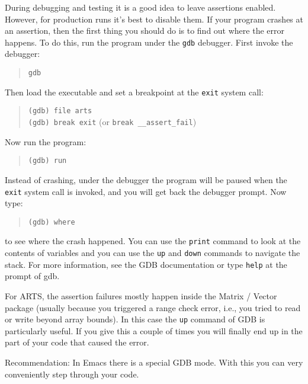 During debugging and testing it is a good idea to leave assertions
enabled. However, for production runs it's best to disable them. If
your program crashes at an assertion, then the first thing you should
do is to find out where the error happens. To do this, run the program
under the \verb|gdb| debugger. First invoke the debugger:
\begin{quote}
\verb|gdb|
\end{quote}
Then load the executable and set a breakpoint at the \verb|exit|
system call:
\begin{quote}
  \verb|(gdb) file arts|\\
  \verb|(gdb) break exit| (or \verb|break __assert_fail|)
\end{quote}
Now run the program: 
\begin{quote}
  \verb|(gdb) run|
\end{quote}

Instead of crashing, under the debugger the program will be paused
when the \verb|exit| system call is invoked, and you will get back the
debugger prompt. Now type:
\begin{quote}
  \verb|(gdb) where| 
\end{quote}  
to see where the crash happened. You can use the \verb|print| command to
look at the contents of variables and you can use the \verb|up| and \verb|down|
commands to navigate the stack. For more information, see the GDB
documentation or type \verb|help| at the prompt of gdb.

For ARTS, the assertion failures mostly happen inside the Matrix /
Vector package (usually because you triggered a range check error,
i.e., you tried to read or write beyond array bounds). In this case the
\verb|up| command of GDB is particularly useful. If you give this a
couple of times you will finally end up in the part of your code that
caused the error.

Recommendation: In Emacs there is a special GDB mode. With this you
can very conveniently step through your code.




